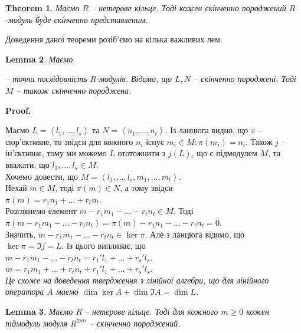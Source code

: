 \documentclass[a4paper, 10pt]{article}
\makeatletter
\theoremstyle{theoremdd}
\newtheorem{theorem}{Theorem}[subsection]
\theoremstyle{theoremdd}
\theoremstyle{theoremdd}
\theoremstyle{theoremdd}
\theoremstyle{theoremdd}
\theoremstyle{theoremdd}
\theoremstyle{theoremdd}
\theoremstyle{theoremdd}
\theoremstyle{theoremdd}
\theoremstyle{theoremdd}
\theoremstyle{theoremdd}
\theoremstyle{theoremdd}
\theoremstyle{theoremdd}
\newtheorem{lemma}[theorem]{Lemma}
\theoremstyle{theoremdd}
\theoremstyle{theoremdd}
\renewenvironment{proof}[1][Proof.\\]{\par
\pushQED{\hfill \qed}%
\normalfont \topsep6\p@\@plus6\p@\relax
\trivlist
\item\relax
{\bfseries
#1\@addpunct{.}}\hspace\labelsep\ignorespaces
}{%
\popQED\endtrivlist\@endpefalse
}
\makeatother
\begin{document}
\begin{theorem}
Маємо $R$ -- нетерове кільце. Тоді кожен скінченно породжений $R$-модуль буде скінченно представленим.
\end{theorem}

Доведення даної теореми розіб'ємо на кілька важливих лем.

\begin{lemma}
Маємо  -- точна послідовність $R$-модулів. Відомо, що $L,N$ -- скінченно породжені. Тоді $M$ -- також скінченно породжена.
\end{lemma}

\begin{proof}
Маємо $L = \left< l_1,\dots,l_s \right>$ та $N = \left< n_1,\dots,n_t\right>$. Із ланцюга видно, що $\pi$ -- сюр'єктивне, то звідси для кожного $n_i$ існує $m_i \in M: \pi(m_i) = n_i$. Також $j$ -- ін'єктивне, тому ми можемо $L$ ототожнити з $j(L)$, що є підмодулем $M$, та вважати, що $l_1,\dots,l_s \in M$.\\ Хочемо довести, що $M = \left< l_1,\dots,l_s,m_1,\dots,m_t \right>$.\\
Нехай $m \in M$, тоді $\pi(m) \in N$, а тому звідси\\
$\pi(m) = r_1 n_1 + \dots + r_t n_t$.\\
Розглянемо елемент $m - r_1m_1 - \dots - r_t n_t \in M$. Тоді\\
$\pi(m - r_1m_1 - \dots - r_t n_t ) = \pi(m) - r_1 n_1 - \dots - r_t n_t = 0$.\\
Значить, $m - r_1m_1 - \dots - r_t n_t \in \ker \pi$. Але з ланцюга відомо, що $\ker \pi = \Im j = L$. Із цього випливає, що\\
$m - r_1m_1 - \dots - r_t n_t = r_1'l_1 + \dots + r_s' l_s$.\\
$m =  r_1m_1 + \dots + r_t n_t + r_1'l_1 + \dots + r_s' l_s$.\\
\textit{Це схоже на доведення твердження з лінійної алгебри, що для лінійного оператора $A$ маємо $\dim \ker A + \dim \Im A = \dim L$.}
\end{proof}

\begin{lemma}
Маємо $R$ -- нетерове кільце. Тоді для кожного $m \geq 0$ кожен підмодуль модуля $R^{\oplus m}$ -- скінченно породжений.
\end{lemma}
\end{document}
